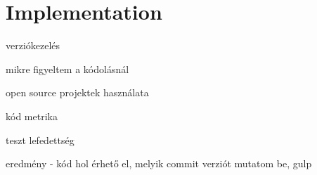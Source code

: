 \chapter{Implementation}

verziókezelés

mikre figyeltem a kódolásnál

open source projektek használata

kód metrika

teszt lefedettség

eredmény - kód hol érhető el, melyik commit verziót mutatom be, gulp